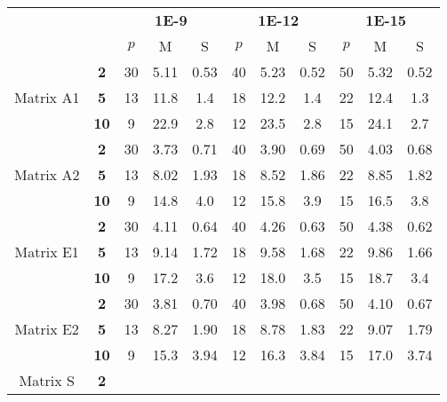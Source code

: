
\begin{table}
\begin{center}
\begin{tabular}{cc|c|c|c|c|c|c|c|c|c|}
\cline{3-11}
& & \multicolumn{3}{|c|}{\textbf{1E-9}} &
\multicolumn{3}{|c|}{\textbf{1E-12}} & \multicolumn{3}{|c|}{\textbf{1E-15}} \\
\cline{3-11}
& & $p$ & M & S & $p$ & M & S & $p$ & M & S \\
\hline
\multicolumn{1}{|c|}{\multirow{3}{*}{Matrix A1}} & \textbf{2} &
    30 & 5.11 & 0.53 & 40 & 5.23 & 0.52 & 50 & 5.32 & 0.52 \\
\cline{2-11}
\multicolumn{1}{|c|}{} &\textbf{5} &
    13 & 11.8 & 1.4 & 18 & 12.2 & 1.4 & 22 & 12.4 & 1.3 \\
\cline{2-11}
\multicolumn{1}{|c|}{} &\textbf{10} &
    9 & 22.9 & 2.8  & 12 & 23.5 & 2.8  & 15 & 24.1 & 2.7 \\
\hline
\hline
\multicolumn{1}{|c|}{\multirow{3}{*}{Matrix A2}} & \textbf{2} &
    30 & 3.73 & 0.71 & 40 & 3.90 & 0.69 & 50 & 4.03 & 0.68 \\
\cline{2-11}
\multicolumn{1}{|c|}{} & \textbf{5} &
    13 & 8.02 & 1.93 & 18 & 8.52 & 1.86 & 22 & 8.85 & 1.82 \\
\cline{2-11}
\multicolumn{1}{|c|}{} & \textbf{10} &
    9 & 14.8 & 4.0  & 12 & 15.8 & 3.9  & 15 & 16.5 & 3.8 \\
\hline
\hline
\multicolumn{1}{|c|}{\multirow{3}{*}{Matrix E1}} & \textbf{2} &
    30 & 4.11 & 0.64 & 40 & 4.26 & 0.63 & 50 & 4.38 & 0.62 \\
\cline{2-11}
\multicolumn{1}{|c|}{} & \textbf{5} &
    13 & 9.14  & 1.72  & 18 & 9.58  & 1.68  & 22 & 9.86  & 1.66 \\
\cline{2-11}
\multicolumn{1}{|c|}{} & \textbf{10} &
    9 & 17.2 & 3.6   & 12 & 18.0  & 3.5  & 15 & 18.7 & 3.4 \\
\hline
\hline
\multicolumn{1}{|c|}{\multirow{3}{*}{Matrix E2}} & \textbf{2} &
    30 & 3.81 & 0.70 & 40 & 3.98 & 0.68 & 50 & 4.10 & 0.67 \\
\cline{2-11}
\multicolumn{1}{|c|}{} & \textbf{5} &
    13 & 8.27  & 1.90  & 18 & 8.78  & 1.83  & 22 & 9.07  & 1.79 \\
\cline{2-11}
\multicolumn{1}{|c|}{} & \textbf{10} &
    9 & 15.3 & 3.94   & 12 & 16.3  & 3.84  & 15 & 17.0 & 3.74 \\
\hline
\hline
\multicolumn{1}{|c|}{\multirow{3}{*}{Matrix S}} & \textbf{2} &

\end{tabular}
\end{center}
\end{table}
